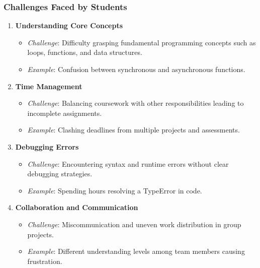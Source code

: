 \documentclass{beamer}
\begin{document}
\begin{frame}[fragile]
    \frametitle{Challenges Faced by Students}
    \begin{enumerate}
        \item \textbf{Understanding Core Concepts}
        \begin{itemize}
            \item \textit{Challenge}: Difficulty grasping fundamental programming concepts such as loops, functions, and data structures.
            \item \textit{Example}: Confusion between synchronous and asynchronous functions.
        \end{itemize}
        
        \item \textbf{Time Management}
        \begin{itemize}
            \item \textit{Challenge}: Balancing coursework with other responsibilities leading to incomplete assignments.
            \item \textit{Example}: Clashing deadlines from multiple projects and assessments.
        \end{itemize}
        
        \item \textbf{Debugging Errors}
        \begin{itemize}
            \item \textit{Challenge}: Encountering syntax and runtime errors without clear debugging strategies.
            \item \textit{Example}: Spending hours resolving a TypeError in code.
        \end{itemize}
        
        \item \textbf{Collaboration and Communication}
        \begin{itemize}
            \item \textit{Challenge}: Miscommunication and uneven work distribution in group projects.
            \item \textit{Example}: Different understanding levels among team members causing frustration.
        \end{itemize}
    \end{enumerate}
\end{frame}
\end{document}
